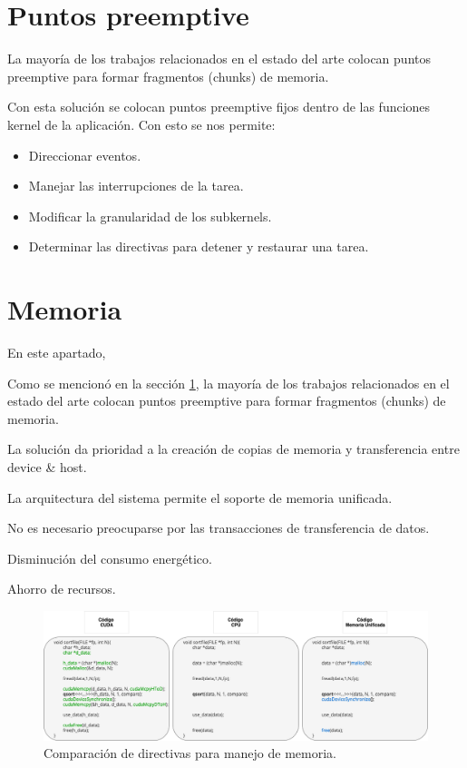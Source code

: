   \section{Puntos preemptive}\label{puntosPreemptive}

La mayoría de los trabajos relacionados en el estado del arte colocan puntos preemptive para formar fragmentos (chunks) de memoria.

Con esta solución se colocan puntos preemptive fijos dentro de las funciones kernel de la aplicación. Con esto se nos permite:

\begin{itemize}
\item Direccionar eventos.
\item Manejar las interrupciones de la tarea.
\item Modificar la granularidad de los subkernels.
\item Determinar las directivas para detener y restaurar una tarea.
\end{itemize}     
  
  \section{Memoria}
  
  En este apartado, 
  
  Como se mencionó en la sección \ref{puntosPreemptive}, la mayoría de los trabajos relacionados en el estado del arte colocan puntos preemptive para formar fragmentos (chunks) de memoria.
  
  La solución da prioridad a la creación de copias de memoria y transferencia entre device & host.
  
  La arquitectura del sistema permite el soporte de memoria unificada.
  
  No es necesario preocuparse por las transacciones de transferencia de datos.
  
  Disminución del consumo energético.
  
  Ahorro de recursos.
  
  \begin{figure}[ht]
      \centering
        \includegraphics[scale=.50]{img/direcMem}
        \caption{Comparación de directivas para manejo de memoria.}
        \label{fig:direcMem}
    \end{figure}
  
